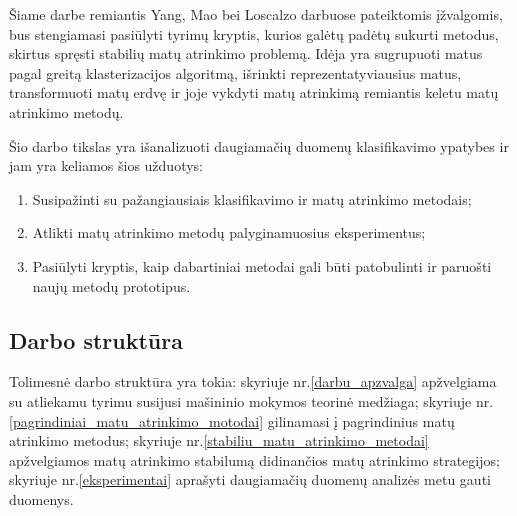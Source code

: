 Šiame darbe remiantis Yang, Mao bei Loscalzo darbuose pateiktomis įžvalgomis, bus stengiamasi pasiūlyti tyrimų kryptis, kurios galėtų padėtų sukurti metodus, skirtus spręsti stabilių matų atrinkimo problemą. Idėja yra sugrupuoti matus pagal greitą klasterizacijos algoritmą, išrinkti reprezentatyviausius matus, transformuoti matų erdvę ir joje vykdyti matų atrinkimą remiantis keletu matų atrinkimo metodų.

Šio darbo tikslas yra išanalizuoti daugiamačių duomenų klasifikavimo ypatybes ir jam yra keliamos šios užduotys:
\begin{enumerate}
 \item Susipažinti su pažangiausiais klasifikavimo ir matų atrinkimo metodais;
 \item Atlikti matų atrinkimo metodų palyginamuosius eksperimentus;
 \item Pasiūlyti kryptis, kaip dabartiniai metodai gali būti patobulinti ir paruošti naujų metodų prototipus.
\end{enumerate}

\subsection*{Darbo struktūra}

Tolimesnė darbo struktūra yra tokia: skyriuje nr.\ref{darbu_apzvalga} apžvelgiama su atliekamu tyrimu susijusi mašininio mokymos teorinė medžiaga; skyriuje nr.\ref{pagrindiniai_matu_atrinkimo_motodai} gilinamasi į pagrindinius matų atrinkimo metodus; skyriuje nr.\ref{stabiliu_matu_atrinkimo_metodai} apžvelgiamos matų atrinkimo stabilumą didinančios matų atrinkimo strategijos; skyriuje nr.\ref{eksperimentai} aprašyti daugiamačių duomenų analizės metu gauti duomenys.

